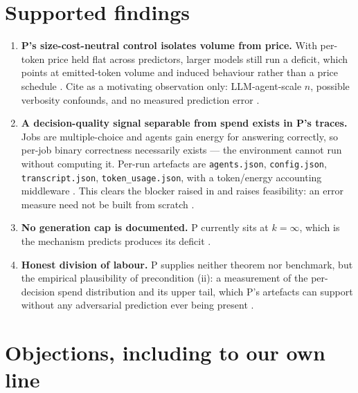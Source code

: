 \documentclass{article}
\begin{document}
\section{Supported findings}

\begin{enumerate}
  \item \textbf{P's size-cost-neutral control isolates volume from price.} With per-token
        price held flat across predictors, larger models still run a deficit, which points
        at emitted-token volume and induced behaviour rather than a price schedule
        . Cite as a motivating observation only: LLM-agent-scale \(n\),
        possible verbosity confounds, and no measured prediction error .
  \item \textbf{A decision-quality signal separable from spend exists in P's traces.}
        Jobs are multiple-choice and agents gain energy for answering correctly, so
        per-job binary correctness necessarily exists --- the environment cannot run
        without computing it. Per-run artefacts are \texttt{agents.json},
        \texttt{config.json}, \texttt{transcript.json}, \texttt{token\_usage.json}, with a
        token/energy accounting middleware . This clears the blocker raised
        in  and raises feasibility: an error measure need not be built from
        scratch .
  \item \textbf{No generation cap is documented.} P currently sits at \(k = \infty\),
        which is the mechanism  predicts produces its deficit .
  \item \textbf{Honest division of labour.} P supplies neither theorem nor benchmark, but
        the empirical plausibility of precondition (ii): a measurement of the per-decision
        spend distribution and its upper tail, which P's artefacts can support without any
        adversarial prediction ever being present .
\end{enumerate}

\section{Objections, including to our own line}
\end{document}
